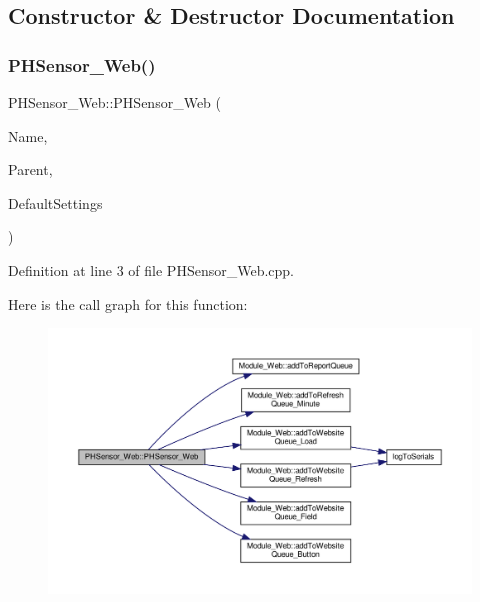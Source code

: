 \subsection{Constructor \& Destructor Documentation}
\mbox{\label{class_p_h_sensor___web_a1620625830d29822b30407d064d207c5}} 
\subsubsection{\texorpdfstring{P\+H\+Sensor\+\_\+\+Web()}{PHSensor\_Web()}}
{\footnotesize\ttfamily P\+H\+Sensor\+\_\+\+Web\+::\+P\+H\+Sensor\+\_\+\+Web (\begin{DoxyParamCaption}\item[{const \+\_\+\+\_\+\+Flash\+String\+Helper $\ast$}]{Name,  }\item[{\hyperlink{class_module___web}{Module\+\_\+\+Web} $\ast$}]{Parent,  }\item[{\hyperlink{struct_settings_1_1_p_h_sensor_settings}{Settings\+::\+P\+H\+Sensor\+Settings} $\ast$}]{Default\+Settings }\end{DoxyParamCaption})}



Definition at line 3 of file P\+H\+Sensor\+\_\+\+Web.\+cpp.

Here is the call graph for this function\+:
\nopagebreak
\begin{figure}[H]
\begin{center}
\leavevmode
\includegraphics[width=350pt]{class_p_h_sensor___web_a1620625830d29822b30407d064d207c5_cgraph}
\end{center}
\end{figure}



